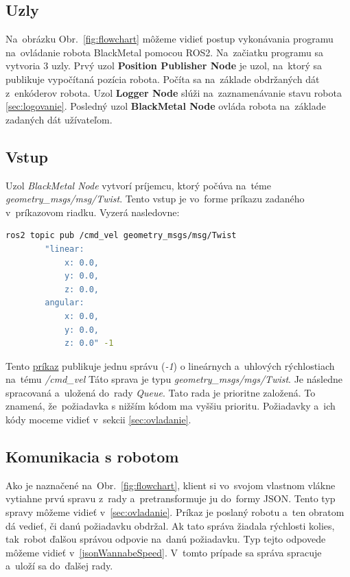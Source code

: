 \subsection{Uzly}

Na~obrázku Obr.~\ref{fig:flowchart} môžeme vidieť postup vykonávania programu na~ovládanie robota BlackMetal pomocou ROS2.
Na~začiatku programu sa vytvoria 3 uzly. Prvý uzol \textbf{Position Publisher Node} je uzol, na~ktorý sa publikuje vypočítaná pozícia robota.
Počíta sa na~základe obdržaných dát z~enkóderov robota. Uzol \textbf{Logger Node} slúži na~zaznamenávanie stavu robota \ref{sec:logovanie}.
Posledný uzol \textbf{BlackMetal Node} ovláda robota na~základe zadaných dát užívateľom.

\subsection{Vstup}

Uzol \textit{BlackMetal Node} vytvorí príjemcu, ktorý počúva na~téme \textit{geometry\_msgs/msg/Twist}. Tento vstup je vo~forme príkazu
zadaného v~príkazovom riadku. Vyzerá nasledovne:


\label{requestCommand}
\begin{lstlisting}[language=bash]
	ros2 topic pub /cmd_vel geometry_msgs/msg/Twist
		"linear:
			x: 0.0,
			y: 0.0,
			z: 0.0,
		angular:
			x: 0.0,
			y: 0.0,
			z: 0.0" -1
\end{lstlisting}

Tento \hyperref[requestCommand]{príkaz} publikuje jednu správu (\textit{-1}) o lineárnych a~uhlových rýchlostiach na~tému \textit{/cmd\_vel}
Táto sprava je typu \textit{geometry\_msgs/mgs/Twist}. Je následne spracovaná a~uložená do~rady \textit{Queue}. Tato rada je prioritne založená.
To znamená, že~požiadavka s nižším kódom ma vyššiu prioritu. Požiadavky a~ich kódy moceme vidieť v~sekcii \ref{sec:ovladanie}.

\subsection{Komunikacia s robotom}
\label{sec:robotComms}

Ako je naznačené na~Obr.~\ref{fig:flowchart}, klient si vo~svojom vlastnom vlákne vytiahne prvú spravu z~rady a~pretransformuje ju do~formy JSON.
Tento typ spravy môžeme vidieť v~\ref{sec:ovladanie}. Príkaz je poslaný robotu a~ten obratom dá vedieť, či danú požiadavku obdržal. Ak tato správa
žiadala rýchlosti kolies, tak~robot ďalšou správou odpovie na~danú požiadavku. Typ tejto odpovede môžeme vidieť v~\ref{jsonWannabeSpeed}. V~tomto prípade
sa správa spracuje a~uloží sa do~ďalšej rady.


